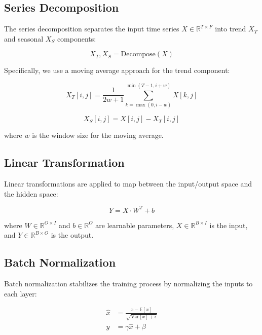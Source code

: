 \documentclass[11pt,a4paper]{article}
\begin{document}
\subsection{Series Decomposition}

The series decomposition separates the input time series $X \in \mathbb{R}^{T \times F}$ into trend $X_T$ and seasonal $X_S$ components:

\begin{equation}
X_T, X_S = \text{Decompose}(X) \label{eq:decompose}
\end{equation}

Specifically, we use a moving average approach for the trend component:

\begin{equation}
X_T[i, j] = \frac{1}{2w + 1} \sum_{k=\max(0,i-w)}^{\min(T-1,i+w)} X[k, j] \label{eq:trend_component}
\end{equation}

\begin{equation}
X_S[i, j] = X[i, j] - X_T[i, j] \label{eq:seasonal_component}
\end{equation}

where $w$ is the window size for the moving average.

\subsection{Linear Transformation}

Linear transformations are applied to map between the input/output space and the hidden space:

\begin{equation}
Y = X \cdot W^T + b \label{eq:linear_transform}
\end{equation}

where $W \in \mathbb{R}^{O \times I}$ and $b \in \mathbb{R}^O$ are learnable parameters, $X \in \mathbb{R}^{B \times I}$ is the input, and $Y \in \mathbb{R}^{B \times O}$ is the output.

\subsection{Batch Normalization}

Batch normalization stabilizes the training process by normalizing the inputs to each layer:

\begin{align}
\hat{x} &= \frac{x - \mathbb{E}[x]}{\sqrt{\text{Var}[x] + \epsilon}} \label{eq:batch_norm_1} \\
y &= \gamma \hat{x} + \beta \label{eq:batch_norm_2}
\end{align}
\end{document}

